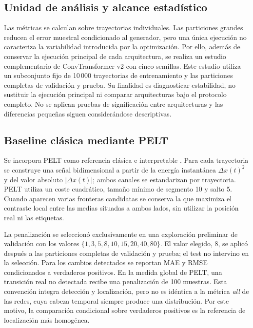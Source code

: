 \documentclass[a4paper,12pt]{article}
\begin{document}
\subsection{Unidad de análisis y alcance estadístico}

Las métricas se calculan sobre trayectorias individuales. Las particiones grandes reducen el error muestral condicionado al generador, pero una única ejecución no caracteriza la variabilidad introducida por la optimización. Por ello, además de conservar la ejecución principal de cada arquitectura, se realiza un estudio complementario de ConvTransformer-v2 con cinco semillas. Este estudio utiliza un subconjunto fijo de 10\,000 trayectorias de entrenamiento y las particiones completas de validación y prueba. Su finalidad es diagnosticar estabilidad, no sustituir la ejecución principal ni comparar arquitecturas bajo el protocolo completo. No se aplican pruebas de significación entre arquitecturas y las diferencias pequeñas siguen considerándose descriptivas.

\subsection{Baseline clásica mediante PELT}

Se incorpora PELT como referencia clásica e interpretable \cite{killick2012optimal}. Para cada trayectoria se construye una señal bidimensional a partir de la energía instantánea $\Delta x(t)^2$ y del valor absoluto $|\Delta x(t)|$; ambos canales se estandarizan por trayectoria. PELT utiliza un coste cuadrático, tamaño mínimo de segmento 10 y salto 5. Cuando aparecen varias fronteras candidatas se conserva la que maximiza el contraste local entre las medias situadas a ambos lados, sin utilizar la posición real ni las etiquetas.

La penalización se seleccionó exclusivamente en una exploración preliminar de validación con los valores $\{1,3,5,8,10,15,20,40,80\}$. El valor elegido, 8, se aplicó después a las particiones completas de validación y prueba; el test no intervino en la selección. Para los cambios detectados se reportan MAE y RMSE condicionados a verdaderos positivos. En la medida global de PELT, una transición real no detectada recibe una penalización de 100 muestras. Esta convención integra detección y localización, pero no es idéntica a la métrica \emph{all} de las redes, cuya cabeza temporal siempre produce una distribución. Por este motivo, la comparación condicional sobre verdaderos positivos es la referencia de localización más homogénea.
\end{document}
